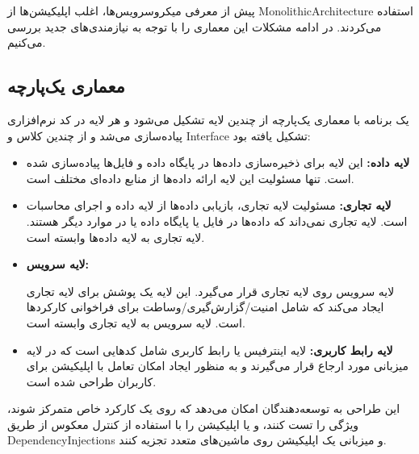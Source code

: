 پیش از معرفی میکروسرویس‌ها، اغلب اپلیکیشن‌ها از
\gls{MonolithicArchitecture}
استفاده می‌کردند. در ادامه مشکلات این معماری را با توجه به نیازمندی‌های جدید بررسی می‌کنیم.

\subsection{معماری یک‌پارچه}
یک برنامه با معماری یک‌پارچه از چندین لایه تشکیل می‌شود و هر لایه در کد نرم‌افزاری پیاده‌سازی می‌شد و از چندین کلاس و
\gls{Interface}
تشکیل یافته بود:

\begin{itemize}

\item
\textbf{
لایه داده:
}
این لایه برای ذخیره‌سازی داده‌ها در پایگاه داده و فایل‌ها پیاده‌سازی شده است. تنها مسئولیت این لایه ارائه داده‌ها از منابع داده‌ای مختلف است.

\item
\textbf{
لایه تجاری:
}
مسئولیت لایه تجاری، بازیابی داده‌ها از لایه داده و اجرای محاسبات است. لایه تجاری نمی‌داند که داده‌ها در فایل یا پایگاه داده یا در موارد دیگر هستند. لایه تجاری به لایه داده‌ها وابسته است.

\item
\textbf{
لایه سرویس:
}

لایه سرویس روی لایه تجاری قرار می‌گیرد. این لایه یک پوشش برای لایه تجاری ایجاد می‌کند که شامل امنیت/گزارش‌گیری/وساطت برای فراخوانی کارکردها است. لایه سرویس به لایه تجاری وابسته است.

\item
\textbf{
لایه رابط کاربری:
}
لایه اینترفیس یا رابط کاربری شامل کدهایی است که در لایه میزبانی مورد ارجاع قرار می‌گیرند و به منظور ایجاد امکان تعامل با اپلیکیشن برای کاربران طراحی شده است.

\end{itemize}

این طراحی به توسعه‌دهندگان امکان می‌دهد که روی یک کارکرد خاص متمرکز شوند، ویژگی را تست کنند، و یا اپلیکیشن را با استفاده از کنترل معکوس از طریق
\glspl{DependencyInjection}
و میزبانی یک اپلیکیشن روی ماشین‌های متعدد تجزیه کنند.

